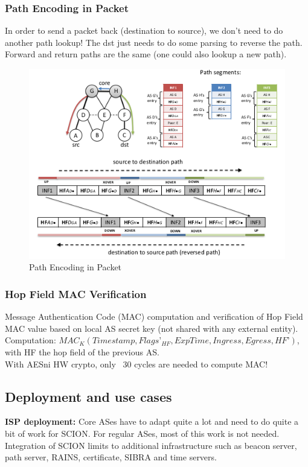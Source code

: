 \documentclass[11pt,oneside,a4paper]{article}
\begin{document}
\subsubsection{Path Encoding in Packet}

In order to send a packet back (destination to source), we don't need to do another path lookup! The dst just needs to do some parsing to reverse the path. Forward and return paths are the same (one could also lookup a new path).

\begin{figure}[t!]
	\centering
	\includegraphics[width=0.7\linewidth]{figures/scion_path_encoding}
	\caption{Path Encoding in Packet}
	\label{fig:scionpathencoding}
\end{figure}

\subsubsection{Hop Field MAC Verification}

Message Authentication Code (MAC) computation and verification of Hop Field MAC value based on local AS secret key (not shared with any external entity).\\
Computation: $MAC_K(Timestamp,Flags’_{HF},ExpTime,Ingress,Egress, HF’)$, with HF the hop field of the previous AS.\\
With AESni HW crypto, only ~30 cycles are needed to compute MAC!

\newpage

\subsection{Deployment and use cases}

\textbf{ISP deployment:} Core ASes have to adapt quite a lot and need to do quite a bit of work for SCION. For regular ASes, most of this work is not needed. Integration of SCION limits to additional infrastructure such as beacon server, path server, RAINS, certificate, SIBRA and time servers.
\end{document}
